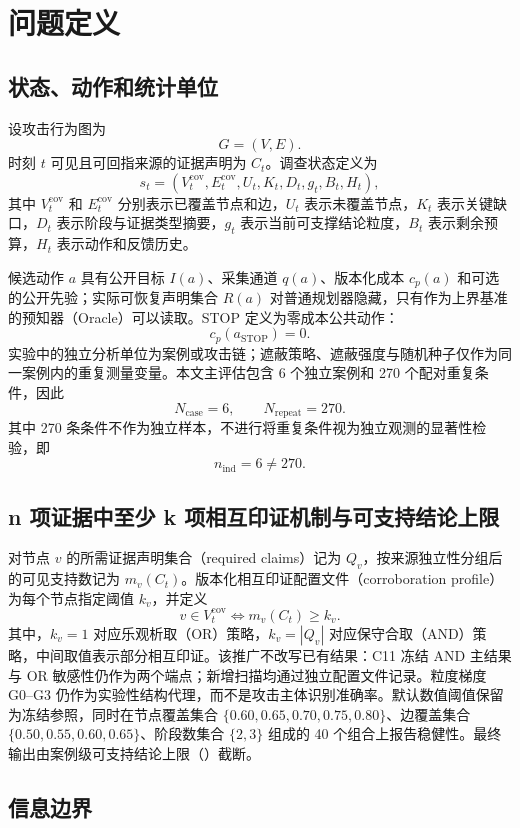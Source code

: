 \documentclass[UTF8,a4paper,twocolumn,zihao=5,fontset=fandol]{ctexart}
\newcommand{\code}[1]{\texttt{\detokenize{#1}}}
\begin{document}
\section{问题定义}

\subsection{状态、动作和统计单位}

设攻击行为图为
\[
G=(V,E).
\]
时刻 $t$ 可见且可回指来源的证据声明为 $C_t$。调查状态定义为
\[
s_t=\left(V_t^{\mathrm{cov}},E_t^{\mathrm{cov}},U_t,K_t,D_t,g_t,B_t,H_t\right),
\]
其中 $V_t^{\mathrm{cov}}$ 和 $E_t^{\mathrm{cov}}$ 分别表示已覆盖节点和边，$U_t$ 表示未覆盖节点，$K_t$ 表示关键缺口，$D_t$ 表示阶段与证据类型摘要，$g_t$ 表示当前可支撑结论粒度，$B_t$ 表示剩余预算，$H_t$ 表示动作和反馈历史。

候选动作 $a$ 具有公开目标 $I(a)$、采集通道 $q(a)$、版本化成本 $c_p(a)$ 和可选的公开先验；实际可恢复声明集合 $R(a)$ 对普通规划器隐藏，只有作为上界基准的预知器（Oracle）可以读取。STOP 定义为零成本公共动作：
\[
c_p(a_{\mathrm{STOP}})=0.
\]
实验中的独立分析单位为案例或攻击链；遮蔽策略、遮蔽强度与随机种子仅作为同一案例内的重复测量变量。本文主评估包含 6 个独立案例和 270 个配对重复条件，因此
\[
N_{\mathrm{case}}=6,\qquad N_{\mathrm{repeat}}=270.
\]
其中 270 条条件不作为独立样本，不进行将重复条件视为独立观测的显著性检验，即
\[
n_{\mathrm{ind}}=6\ne270.
\]

\subsection{n 项证据中至少 k 项相互印证机制与可支持结论上限}

对节点 $v$ 的所需证据声明集合（required claims）记为 $Q_v$，按来源独立性分组后的可见支持数记为 $m_v(C_t)$。版本化相互印证配置文件（corroboration profile）为每个节点指定阈值 $k_v$，并定义
\[
v\in V_t^{\mathrm{cov}}\Longleftrightarrow m_v(C_t)\ge k_v.
\]
其中，$k_v=1$ 对应乐观析取（OR）策略，$k_v=|Q_v|$ 对应保守合取（AND）策略，中间取值表示部分相互印证。该推广不改写已有结果：C11 冻结 AND 主结果与 OR 敏感性仍作为两个端点；新增扫描均通过独立配置文件记录。粒度梯度 G0--G3 仍作为实验性结构代理，而不是攻击主体识别准确率。默认数值阈值保留为冻结参照，同时在节点覆盖集合 $\{0.60,0.65,0.70,0.75,0.80\}$、边覆盖集合 $\{0.50,0.55,0.60,0.65\}$、阶段数集合 $\{2,3\}$ 组成的 40 个组合上报告稳健性。最终输出由案例级可支持结论上限（\code{support_ceiling}）截断。

\subsection{信息边界}
\end{document}
